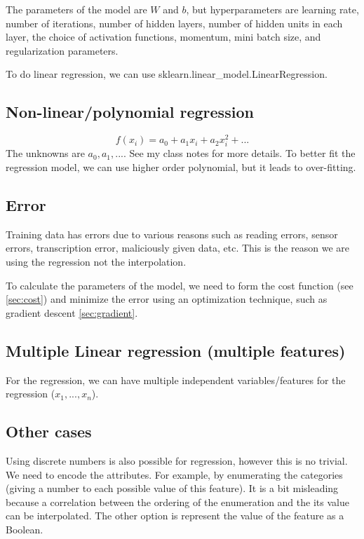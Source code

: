\documentclass[12pt]{report}
\begin{document}
The parameters of the model are $W $ and $b$, but hyperparameters are learning rate, number of iterations, number of hidden layers, number of hidden units in each layer, the choice of activation functions, momentum, mini batch size, and regularization parameters.

To do linear regression, we can use sklearn.linear\_model.LinearRegression.

\subsection{Non-linear/polynomial regression}
\begin{equation}
	f(x_i) = a_0 + a_1 x_i + a_2 x_i^2 + ...
\end{equation}
The unknowns are $a_0, a_1, ...$.
See my class notes for more details.
To better fit the regression model, we can use higher order polynomial, but it leads to over-fitting.


\subsection{Error}
Training data has errors due to various reasons such as reading errors, sensor errors, transcription error, maliciously given data, etc. This is the reason we are using the regression not the interpolation.

To calculate the parameters of the model, we need to form the cost function (see \ref{sec:cost}) and minimize the error using an optimization technique, such as gradient descent \ref{sec:gradient}.

\subsection{Multiple Linear regression (multiple features)}

For the regression, we can have multiple independent variables/features for the regression ($x_1, ..., x_n$).

\subsection{Other cases}
Using discrete numbers is also possible for regression, however this is no trivial. We need to encode the attributes. For example, by enumerating the categories (giving a number to each possible value of this feature). It is a bit misleading because a correlation between the ordering of the
enumeration and the its value can be interpolated. The other option is represent the value of the feature as a Boolean.
\end{document}
